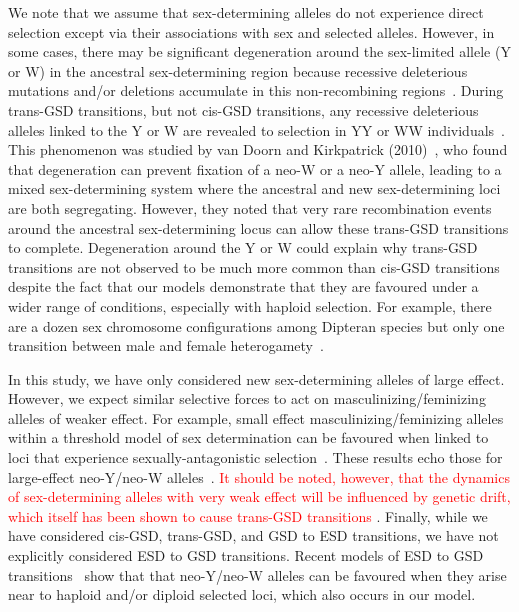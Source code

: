 \documentclass[10pt,letterpaper]{article}
\begin{document}
We note that we assume that sex-determining alleles do not experience direct selection except via their associations with sex and selected alleles.
However, in some cases, there may be significant degeneration around the sex-limited allele (Y or W) in the ancestral sex-determining region because recessive deleterious mutations and/or deletions accumulate in this non-recombining regions~\cite{Rice:1996ke,Charlesworth:2000cc,Bachtrog:2006ed,Marais:2008hm}. 
During trans-GSD transitions, but not cis-GSD transitions, any recessive deleterious alleles linked to the Y or W are revealed to selection in YY or WW individuals~\cite{Bachtrog:2014bx}. 
This phenomenon was studied by van Doorn and Kirkpatrick (2010)~\cite{vanDoorn:2010hu}, who found that degeneration can prevent fixation of a neo-W or a neo-Y allele, leading to a mixed sex-determining system where the ancestral and new sex-determining loci are both segregating. 
However, they noted that very rare recombination events around the ancestral sex-determining locus can allow these trans-GSD transitions to complete.  
Degeneration around the Y or W could explain why trans-GSD transitions are not observed to be much more common than cis-GSD transitions despite the fact that our models demonstrate that they are favoured under a wider range of conditions, especially with haploid selection. 
For example, there are a dozen sex chromosome configurations among Dipteran species but only one transition between male and female heterogamety~\cite{Vicoso:2015hf}. 

In this study, we have only considered new sex-determining alleles of large effect. 
However, we expect similar selective forces to act on masculinizing/feminizing alleles of weaker effect.
For example, small effect masculinizing/feminizing alleles within a threshold model of sex determination can be favoured when linked to loci that experience sexually-antagonistic selection~\cite{Muralidhar2018}. 
These results echo those for large-effect neo-Y/neo-W alleles~\cite{vanDoorn:2007eu,vanDoorn:2010hu}.
\textcolor{red}{It should be noted, however, that the dynamics of sex-determining alleles with very weak effect will be influenced by genetic drift, which itself has been shown to cause trans-GSD transitions \cite{Veller2017}}.
Finally, while we have considered cis-GSD, trans-GSD, and GSD to ESD transitions, we have not explicitly considered ESD to GSD transitions. 
Recent models of ESD to GSD transitions~\cite{Ubeda:2015fx,Muralidhar2018} show that that neo-Y/neo-W alleles can be favoured when they arise near to haploid and/or diploid selected loci, which also occurs in our model. 
\end{document}
